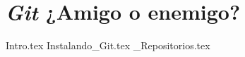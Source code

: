 \chapter{\textit{Git} ¿Amigo o enemigo?}
  {Intro.tex}
  {Instalando_Git.tex}
  {_Repositorios.tex}
  
  \nocite{*}
  \printbibliography[keyword=git]
